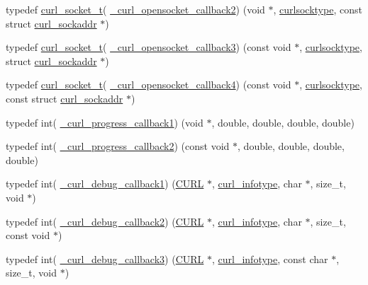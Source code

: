 \begin{DoxyCompactItemize}
\item 
typedef \hyperlink{curl_8h_adb5a46d02359d2379dc7e0904c987828}{curl\+\_\+socket\+\_\+t}( \hyperlink{typecheck-gcc_8h_a94ad8a966561cb2d8182d913924ea3d4}{\+\_\+curl\+\_\+opensocket\+\_\+callback2}) (void $\ast$, \hyperlink{curl_8h_ae319cab849319fca1b222de282506ad9}{curlsocktype}, const struct \hyperlink{structcurl__sockaddr}{curl\+\_\+sockaddr} $\ast$)
\item 
typedef \hyperlink{curl_8h_adb5a46d02359d2379dc7e0904c987828}{curl\+\_\+socket\+\_\+t}( \hyperlink{typecheck-gcc_8h_a41d3335c85e3e2708a787de313b41735}{\+\_\+curl\+\_\+opensocket\+\_\+callback3}) (const void $\ast$, \hyperlink{curl_8h_ae319cab849319fca1b222de282506ad9}{curlsocktype}, struct \hyperlink{structcurl__sockaddr}{curl\+\_\+sockaddr} $\ast$)
\item 
typedef \hyperlink{curl_8h_adb5a46d02359d2379dc7e0904c987828}{curl\+\_\+socket\+\_\+t}( \hyperlink{typecheck-gcc_8h_ac996e9ffa7bb261a4589ce066ac69bb9}{\+\_\+curl\+\_\+opensocket\+\_\+callback4}) (const void $\ast$, \hyperlink{curl_8h_ae319cab849319fca1b222de282506ad9}{curlsocktype}, const struct \hyperlink{structcurl__sockaddr}{curl\+\_\+sockaddr} $\ast$)
\item 
typedef int( \hyperlink{typecheck-gcc_8h_a4a19f089bb72a78916e0c8f6d3eabb43}{\+\_\+curl\+\_\+progress\+\_\+callback1}) (void $\ast$, double, double, double, double)
\item 
typedef int( \hyperlink{typecheck-gcc_8h_a07f7e31041e7c89dd37e0abaa886eda1}{\+\_\+curl\+\_\+progress\+\_\+callback2}) (const void $\ast$, double, double, double, double)
\item 
typedef int( \hyperlink{typecheck-gcc_8h_a7df204c26605e377eb51af8159aaa6aa}{\+\_\+curl\+\_\+debug\+\_\+callback1}) (\hyperlink{curl_8h_ace655e3633b6533591283994d6b5cdda}{C\+U\+R\+L} $\ast$, \hyperlink{curl_8h_a9704d2633927f77efaa3e3c6f1c23a14}{curl\+\_\+infotype}, char $\ast$, size\+\_\+t, void $\ast$)
\item 
typedef int( \hyperlink{typecheck-gcc_8h_abff1bf0f556f56841d7ee494e28488a4}{\+\_\+curl\+\_\+debug\+\_\+callback2}) (\hyperlink{curl_8h_ace655e3633b6533591283994d6b5cdda}{C\+U\+R\+L} $\ast$, \hyperlink{curl_8h_a9704d2633927f77efaa3e3c6f1c23a14}{curl\+\_\+infotype}, char $\ast$, size\+\_\+t, const void $\ast$)
\item 
typedef int( \hyperlink{typecheck-gcc_8h_a6b69c0e254e465fbaf746b1ef7067914}{\+\_\+curl\+\_\+debug\+\_\+callback3}) (\hyperlink{curl_8h_ace655e3633b6533591283994d6b5cdda}{C\+U\+R\+L} $\ast$, \hyperlink{curl_8h_a9704d2633927f77efaa3e3c6f1c23a14}{curl\+\_\+infotype}, const char $\ast$, size\+\_\+t, void $\ast$)

\end{DoxyCompactItemize}
